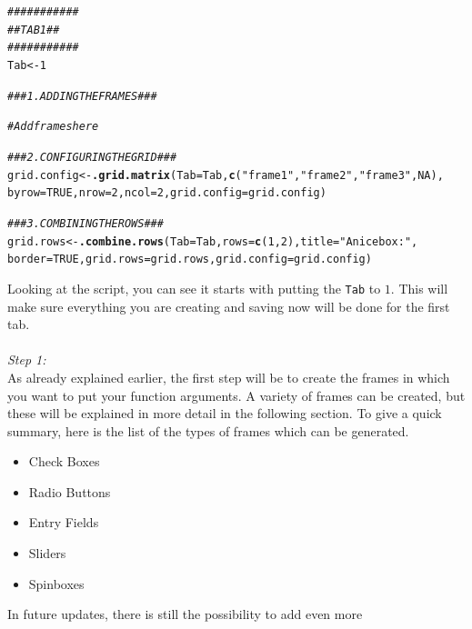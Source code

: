 \documentclass[a4paper]{article}\usepackage[]{graphicx}\usepackage[]{color}
\makeatletter
\newcommand{\hlnum}[1]{\textcolor[rgb]{0.686,0.059,0.569}{#1}}%
\newcommand{\hlstr}[1]{\textcolor[rgb]{0.192,0.494,0.8}{#1}}%
\newcommand{\hlcom}[1]{\textcolor[rgb]{0.678,0.584,0.686}{\textit{#1}}}%
\newcommand{\hlstd}[1]{\textcolor[rgb]{0.345,0.345,0.345}{#1}}%
\newcommand{\hlkwb}[1]{\textcolor[rgb]{0.69,0.353,0.396}{#1}}%
\newcommand{\hlkwc}[1]{\textcolor[rgb]{0.333,0.667,0.333}{#1}}%
\newcommand{\hlkwd}[1]{\textcolor[rgb]{0.737,0.353,0.396}{\textbf{#1}}}%
\newenvironment{kframe}{%
 \def\at@end@of@kframe{}%
 \ifinner\ifhmode%
  \def\at@end@of@kframe{\end{minipage}}%
  \begin{minipage}{\columnwidth}%
 \fi\fi%
 \def\FrameCommand##1{\hskip\@totalleftmargin \hskip-\fboxsep
 \colorbox{shadecolor}{##1}\hskip-\fboxsep
     \hskip-\linewidth \hskip-\@totalleftmargin \hskip\columnwidth}%
 \MakeFramed {\advance\hsize-\width
   \@totalleftmargin\z@ \linewidth\hsize
   \@setminipage}}%
 {\par\unskip\endMakeFramed%
 \at@end@of@kframe}
\newenvironment{knitrout}{}{} %
\makeatother
\begin{document}
\begin{knitrout}
\color{fgcolor}\begin{kframe}
\begin{alltt}
\hlcom{###########}
\hlcom{## TAB 1 ##}
\hlcom{###########}
\hlstd{Tab} \hlkwb{<-} \hlnum{1}

\hlcom{### 1. ADDING THE FRAMES ###}

\hlcom{# Add frames here}


\hlcom{### 2. CONFIGURING THE GRID ###}
\hlstd{grid.config} \hlkwb{<-} \hlkwd{.grid.matrix}\hlstd{(}\hlkwc{Tab}\hlstd{=Tab,}\hlkwd{c}\hlstd{(}\hlstr{"frame1"}\hlstd{,}\hlstr{"frame2"}\hlstd{,}\hlstr{"frame3"}\hlstd{,}\hlnum{NA}\hlstd{),}
                \hlkwc{byrow}\hlstd{=}\hlnum{TRUE}\hlstd{,}\hlkwc{nrow}\hlstd{=}\hlnum{2}\hlstd{,}\hlkwc{ncol}\hlstd{=}\hlnum{2}\hlstd{,}\hlkwc{grid.config}\hlstd{=grid.config)}


\hlcom{### 3. COMBINING THE ROWS ###}
\hlstd{grid.rows} \hlkwb{<-} \hlkwd{.combine.rows}\hlstd{(}\hlkwc{Tab}\hlstd{=Tab,}\hlkwc{rows}\hlstd{=}\hlkwd{c}\hlstd{(}\hlnum{1}\hlstd{,}\hlnum{2}\hlstd{),}\hlkwc{title}\hlstd{=}\hlstr{"A nice box: "}\hlstd{,}
                \hlkwc{border}\hlstd{=}\hlnum{TRUE}\hlstd{,}\hlkwc{grid.rows}\hlstd{=grid.rows,}\hlkwc{grid.config}\hlstd{=grid.config)}
\end{alltt}
\end{kframe}
\end{knitrout}
\noindent Looking at the script, you can see it starts with putting the
\verb|Tab| to $1$. This will make sure everything you are
creating and saving now will be done for the first tab. \\ \\
{\it Step 1:}\\
As already explained earlier, the first step will be to create the frames in
which you want to put your function arguments. A variety of frames can be
created, but these will be explained in more detail in the following section. To
give a quick summary, here is the list of the types of frames which can be
generated.
\begin{itemize}
  \item Check Boxes
  \item Radio Buttons
  \item Entry Fields
  \item Sliders
  \item Spinboxes
\end{itemize}
\noindent In future updates, there is still the possibility to add even more
\end{document}
